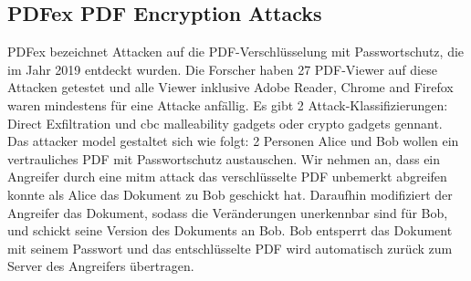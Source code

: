\subsection{PDFex PDF Encryption Attacks}
PDFex bezeichnet Attacken auf die PDF-Verschlüsselung mit Passwortschutz, die im Jahr 2019 entdeckt wurden. Die Forscher haben 27 PDF-Viewer auf diese Attacken getestet und alle Viewer inklusive Adobe Reader, Chrome and Firefox waren mindestens für eine Attacke anfällig. Es gibt 2 Attack-Klassifizierungen: Direct Exfiltration und \gls{cbc} malleability gadgets oder crypto gadgets gennant.
Das attacker model gestaltet sich wie folgt: 2 Personen Alice und Bob wollen ein vertrauliches PDF mit Passwortschutz austauschen. Wir nehmen an, dass ein Angreifer durch eine \gls{mitm} attack das verschlüsselte PDF unbemerkt abgreifen konnte als Alice das Dokument zu Bob geschickt hat. Daraufhin modifiziert der Angreifer das Dokument, sodass die Veränderungen unerkennbar sind für Bob, und schickt seine Version des Dokuments an Bob. Bob entsperrt das Dokument mit seinem Passwort und das entschlüsselte PDF wird automatisch zurück zum Server des Angreifers übertragen. \cite{ccc-break-pdf, pdfex}
\par

